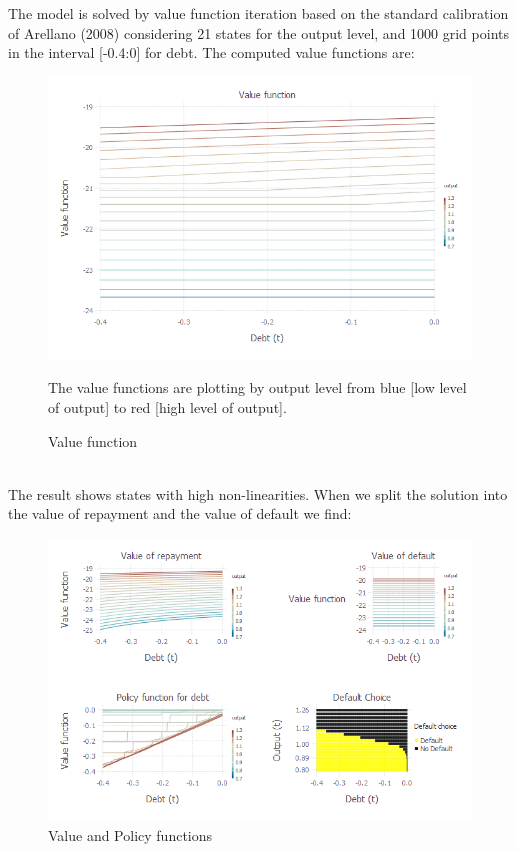 \documentclass[12pt, a4paper]{article}
\begin{document}
The model is solved by value function iteration based on the standard calibration of Arellano (2008)  considering 21 states for the output level, and 1000 grid points in the interval [-0.4:0] for debt. The computed value functions are:
\begin{figure}[!hbt]
	\centering
	\caption{Value function}
	\includegraphics[scale=0.6, trim = 0 12 0 45, clip]{../Plots/ValuFunction.png}
	\begin{minipage}{0.65\textwidth}
	{\scriptsize The value functions are plotting by output level from blue [low level of output]  to red [high level of output].\par}
	\end{minipage}
\end{figure}
\\
The result shows states with high non-linearities. When we split the solution into the value of repayment and the value of default we find: \\
\begin{figure}[!hbt]
	\centering
	\caption{Value and Policy functions}
	\includegraphics[scale=0.55,clip]{../Plots/Model0.png}
\end{figure}
\end{document}
